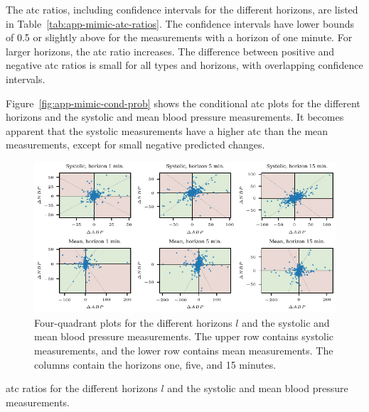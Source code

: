 \documentclass[pdflatex]{sn-jnl}
\theoremstyle{plain}%
\theoremstyle{definition}
\begin{document}
The \ac{atc} ratios, including confidence intervals for the different horizons, are listed in Table~\ref{tab:app-mimic-atc-ratios}.
The confidence intervals have lower bounds of 0.5 or slightly above for the measurements with a horizon of one minute.
For larger horizons, the \ac{atc} ratio increases.
The difference between positive and negative \ac{atc} ratios is small for all types and horizons, with overlapping confidence intervals.

Figure~\ref{fig:app-mimic-cond-prob} shows the conditional \ac{atc} plots for the different horizons and the systolic and mean blood pressure measurements.
It becomes apparent that the systolic measurements have a higher \ac{atc} than the mean measurements, except for small negative predicted changes.

\begin{figure}
    \centering
    \includegraphics{plots/mimic/plot_4q}
    \caption[Four-quadrant plots for the different horizons and the systolic and mean blood pressure measurements. ]{Four-quadrant plots for the different horizons $l$ and the systolic and mean blood pressure measurements. The upper row contains systolic measurements, and the lower row contains mean measurements. The columns contain the horizons one, five, and 15 minutes.}
    \label{fig:app-mimic-4q}
\end{figure}

\begin{table}
    \centering
    
    \caption[ATC ratios for the different horizons $l$ and the systolic and mean blood pressure measurements.]{\Ac{atc} ratios for the different horizons $l$ and the systolic and mean blood pressure measurements.}
    \label{tab:app-mimic-atc-ratios}
\end{table}
\end{document}
